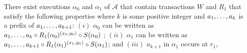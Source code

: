 \begin{lemma} \label{lem:exec3_alpha1} 
There exist  executions $\alpha_0$ and $\alpha_1$ of $\mathcal{A}$ that contain transactions $W$ and  $R_1$ 
that satisfy the following properties where $k$ is some positive integer and $\finiteprefixt{k-1}{k}$ is a prefix of $\finiteprefixt{k}{k+1}$:
$(i)$ $\alpha_0$ can be written as 
$\finiteprefixt{k-1}{k} \circ 
\frage{R_1}{\alpha_0}{x_0, y_0}
 \circ \frage{S}{\alpha_0}{}$ ;
$(ii)$   $\alpha_1$ can be written as 
$\finiteprefixt{k}{k+1} \circ 
\frage{R_1}{\alpha_1}{x_1, y_1}  \circ \frage{S}{\alpha_1}{}$; and  
$(iii)$ $a_{k+1}$ in $\alpha_1$  occurs at  $r_1$, 

\end{lemma}


